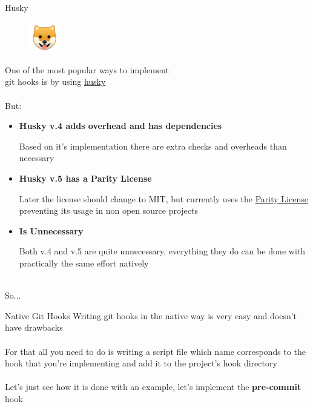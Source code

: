 \documentclass[11pt]{beamer}
\begin{document}
\begin{frame}{Husky}
  \begin{figure}
    \vspace*{-2em}
    \centering
    \includegraphics[width=0.125\textwidth]{husky.png}
  \end{figure}

  One of the most popular ways to implement\\
  git hooks is by using {\color{purple} \href{https://typicode.github.io/husky}{husky}}
  \\~\\
  But:
  \begin{itemize}
    \item \textbf{Husky v.4 adds overhead and has dependencies} \\
      \begin{scriptsize}
  		Based on it's implementation there are extra checks and overheads than necessary
  		\par
           \end{scriptsize}
    \item \textbf{Husky v.5 has a Parity License} \\
      \begin{scriptsize}
        Later the license should change to MIT, but currently uses the {\color{purple} \href{https://paritylicense.com/}{Parity License}}
        preventing its usage in non open source projects
        \par
      \end{scriptsize}
    \item \textbf{Is Unnecessary} \\
	  \begin{scriptsize}
       Both v.4 and v.5 are quite unnecessary, everything they do can be done with practically the same effort natively
       \par
      \end{scriptsize}
  \end{itemize}
  ~\\
  So...
\end{frame}


\begin{frame}{Native Git Hooks}
  Writing git hooks in the native way is very easy and doesn't have drawbacks
  \\~\\
  For that all you need to do is writing a script file which name corresponds to the hook that you're implementing and add it to the project's hook directory
  \\~\\
  Let's just see how it is done with an example, let's implement the \textbf{pre-commit} hook
\end{frame}
\end{document}
